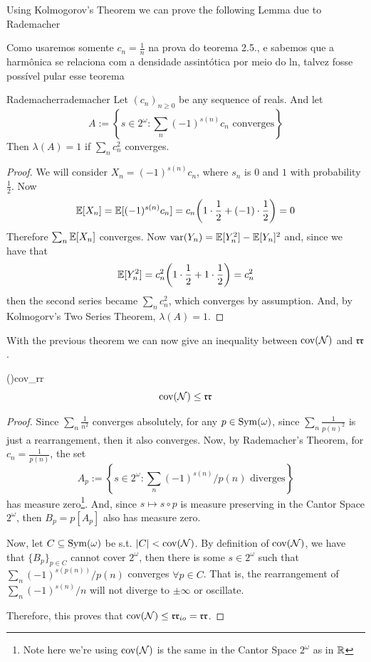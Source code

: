 Using Kolmogorov's Theorem we can prove the following Lemma due to Rademacher

\textcolor{laser_eyes}{Como usaremos somente $c_n=\frac1n$ na prova do teorema 2.5., e sabemos que a harmônica se relaciona com a densidade assintótica por meio do ln, talvez fosse possível pular esse teorema}

\begin{theorem}{Rademacher}{rademacher}
    Let $(c_n)_{n\geq0}$ be any sequence of reals. And let
    $$A:=\left\{s\in2^\omega:\sum_n(-1)^{s(n)}c_n\text{ converges}\right\}$$
    Then $\lambda(A)=1$ if $\sum_nc_n^2$ converges.
\end{theorem}

\begin{proof}
    We will consider $X_n=(-1)^{s(n)}c_n$, where $s_n$ is $0$ and $1$ with probability $\frac12$. Now
    $$\mathbb{E}[X_n]=\mathbb{E}[(-1)^{s(n)}c_n]=c_n{\left(1\cdot\frac12+(-1)\cdot\frac12\right)}=0$$
    Therefore $\sum_n\mathbb{E}[X_n]$ converges. Now $\text{var}(Y_n)=\mathbb{E}[Y_n^2]-\mathbb{E}[Y_n]^2$ and, since we have that
    $$\mathbb{E}[Y_n^2]=c_n^2{\left(1\cdot\frac12+1\cdot\frac12\right)}=c_n^2$$
    then the second series became $\sum_nc_n^2$, which converges by assumption. And, by Kolmogorv's Two Series Theorem, $\lambda(A)=1$.
\end{proof}
With the previous theorem we can now give an inequality between $\text{cov}(\mathcal{N})$ and $\mathfrak{rr}$.

\begin{theorem}{(\cite{blass})}{cov_rr}
    $$\text{cov}(\mathcal{N})\leq\mathfrak{rr}$$
\end{theorem}

\begin{proof}
    Since $\sum_n\frac1{n^2}$ converges absolutely, for any $p\in\mathrm{Sym}(\omega)$, since $\sum_n\frac1{p(n)^2}$ is just a rearrangement, then it also converges. Now, by Rademacher's Theorem, for $c_n=\frac1{p(n)}$, the set
    $$A_p:=\left\{s\in2^\omega:\sum_n(-1)^{s(n)}/p(n)\text{ diverges}\right\}$$
    has measure zero\footnote{Note here we're using $\mathrm{cov}\!\left(\mathcal{N}\right)$ is the same in the Cantor Space $2^\omega$ as in $\mathbb{R}$}. And, since $s\mapsto s\circ p$ is measure preserving in the Cantor Space $2^\omega$, then $B_p=p[A_p]$ also has measure zero.

    Now, let $C\subseteq\mathrm{Sym}(\omega)$ be s.t. $\lvert C\rvert<\text{cov}(\mathcal{N})$. By definition of $\text{cov}(\mathcal{N})$, we have that $\{B_p\}_{p\in C}$ cannot cover $2^\omega$, then there is some $s\in2^\omega$ such that $\sum_n(-1)^{s(p(n))}/p(n)$ converges $\forall p\in C$. That is, the rearrangement of $\sum_n(-1)^{s(n)}/n$ will not diverge to $\pm\infty$ or oscillate.

    Therefore, this proves that $\text{cov}(\mathcal{N})\leq\mathfrak{rr}_{io}=\mathfrak{rr}$.
\end{proof}

